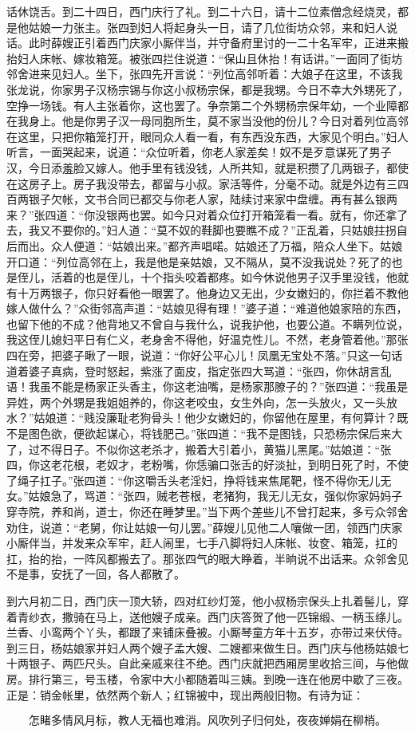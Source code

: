 话休饶舌。到二十四日，西门庆行了礼。到二十六日，请十二位素僧念经烧灵，都是他姑娘一力张主。张四到妇人将起身头一日，请了几位街坊众邻，来和妇人说话。此时薛嫂正引着西门庆家小厮伴当，并守备府里讨的一二十名军牢，正进来搬抬妇人床帐、嫁妆箱笼。被张四拦住说道：“保山且休抬！有话讲。”一面同了街坊邻舍进来见妇人。坐下，张四先开言说：“列位高邻听着：大娘子在这里，不该我张龙说，你家男子汉杨宗锡与你这小叔杨宗保，都是我甥。今日不幸大外甥死了，空挣一场钱。有人主张着你，这也罢了。争奈第二个外甥杨宗保年幼，一个业障都在我身上。他是你男子汉一母同胞所生，莫不家当没他的份儿？今日对着列位高邻在这里，只把你箱笼打开，眼同众人看一看，有东西没东西，大家见个明白。”妇人听言，一面哭起来，说道：“众位听着，你老人家差矣！奴不是歹意谋死了男子汉，今日添羞脸又嫁人。他手里有钱没钱，人所共知，就是积攒了几两银子，都使在这房子上。房子我没带去，都留与小叔。家活等件，分毫不动。就是外边有三四百两银子欠帐，文书合同已都交与你老人家，陆续讨来家中盘缠。再有甚么银两来？”张四道：“你没银两也罢。如今只对着众位打开箱笼看一看。就有，你还拿了去，我又不要你的。”妇人道：“莫不奴的鞋脚也要瞧不成？”正乱着，只姑娘拄拐自后而出。众人便道：“姑娘出来。”都齐声唱喏。姑娘还了万福，陪众人坐下。姑娘开口道：“列位高邻在上，我是他是亲姑娘，又不隔从，莫不没我说处？死了的也是侄儿，活着的也是侄儿，十个指头咬着都疼。如今休说他男子汉手里没钱，他就有十万两银子，你只好看他一眼罢了。他身边又无出，少女嫩妇的，你拦着不教他嫁人做什么？”众街邻高声道：“姑娘见得有理！”婆子道：“难道他娘家陪的东西，也留下他的不成？他背地又不曾自与我什么，说我护他，也要公道。不瞒列位说，我这侄儿媳妇平日有仁义，老身舍不得他，好温克性儿。不然，老身管着他。”那张四在旁，把婆子瞅了一眼，说道：“你好公平心儿！凤凰无宝处不落。”只这一句话道着婆子真病，登时怒起，紫涨了面皮，指定张四大骂道：“张四，你休胡言乱语！我虽不能是杨家正头香主，你这老油嘴，是杨家那膫子的？”张四道：“我虽是异姓，两个外甥是我姐姐养的，你这老咬虫，女生外向，怎一头放火，又一头放水？”姑娘道：“贱没廉耻老狗骨头！他少女嫩妇的，你留他在屋里，有何算计？既不是图色欲，便欲起谋心，将钱肥己。”张四道：“我不是图钱，只恐杨宗保后来大了，过不得日子。不似你这老杀才，搬着大引着小，黄猫儿黑尾。”姑娘道：“张四，你这老花根，老奴才，老粉嘴，你恁骗口张舌的好淡扯，到明日死了时，不使了绳子扛子。”张四道：“你这嚼舌头老淫妇，挣将钱来焦尾靶，怪不得你无儿无女。”姑娘急了，骂道：“张四，贼老苍根，老猪狗，我无儿无女，强似你家妈妈子穿寺院，养和尚，道士，你还在睡梦里。”当下两个差些儿不曾打起来，多亏众邻舍劝住，说道：“老舅，你让姑娘一句儿罢。”薛嫂儿见他二人嚷做一团，领西门庆家小厮伴当，并发来众军牢，赶人闹里，七手八脚将妇人床帐、妆奁、箱笼，扛的扛，抬的抬，一阵风都搬去了。那张四气的眼大睁着，半晌说不出话来。众邻舍见不是事，安抚了一回，各人都散了。

到六月初二日，西门庆一顶大轿，四对红纱灯笼，他小叔杨宗保头上扎着髻儿，穿着青纱衣，撒骑在马上，送他嫂子成亲。西门庆答贺了他一匹锦缎、一柄玉绦儿。兰香、小鸾两个丫头，都跟了来铺床叠被。小厮琴童方年十五岁，亦带过来伏侍。到三日，杨姑娘家并妇人两个嫂子孟大嫂、二嫂都来做生日。西门庆与他杨姑娘七十两银子、两匹尺头。自此亲戚来往不绝。西门庆就把西厢房里收拾三间，与他做房。排行第三，号玉楼，令家中大小都随着叫三姨。到晚一连在他房中歇了三夜。正是：销金帐里，依然两个新人；红锦被中，现出两般旧物。有诗为证：

\[
怎睹多情风月标，教人无福也难消。
风吹列子归何处，夜夜婵娟在柳梢。
\]
